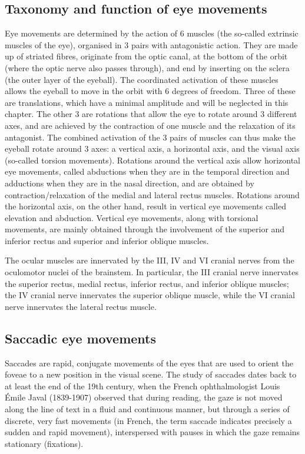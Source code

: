 \documentclass[11pt]{article}
\begin{document}
\subsection{Taxonomy and function of eye movements}
Eye movements are determined by the action of 6 muscles (the so-called extrinsic muscles of the eye), organised in 3 pairs with antagonistic action. They are made up of striated fibres, originate from the optic canal, at the bottom of the orbit (where the optic nerve also passes through), and end by inserting on the sclera (the outer layer of the eyeball). The coordinated activation of these muscles allows the eyeball to move in the orbit with 6 degrees of freedom. Three of these are translations, which have a minimal amplitude and will be neglected in this chapter. The other 3 are rotations that allow the eye to rotate around 3 different axes, and are achieved by the contraction of one muscle and the relaxation of its antagonist. The combined activation of the 3 pairs of muscles can thus make the eyeball rotate around 3 axes: a vertical axis, a horizontal axis, and the visual axis (so-called torsion movements). Rotations around the vertical axis allow horizontal eye movements, called abductions when they are in the temporal direction and adductions when they are in the nasal direction, and are obtained by contraction/relaxation of the medial and lateral rectus muscles. Rotations around the horizontal axis, on the other hand, result in vertical eye movements called elevation and abduction. Vertical eye movements, along with torsional movements, are mainly obtained through the involvement of the superior and inferior rectus and superior and inferior oblique muscles.

The ocular muscles are innervated by the III, IV and VI cranial nerves from the oculomotor nuclei of the brainstem. In particular, the III cranial nerve innervates the superior rectus, medial rectus, inferior rectus, and inferior oblique muscles; the IV cranial nerve innervates the superior oblique muscle, while the VI cranial nerve innervates the lateral rectus muscle.

\subsection{Saccadic eye movements}
Saccades are rapid, conjugate movements of the eyes that are used to orient the foveae to a new position in the visual scene. The study of saccades dates back to at least the end of the 19th century, when the French ophthalmologist Louis Émile Javal (1839-1907) observed that during reading, the gaze is not moved along the line of text in a fluid and continuous manner, but through a series of discrete, very fast movements (in French, the term saccade indicates precisely a sudden and rapid movement), interspersed with pauses in which the gaze remains stationary (fixations).
\end{document}
